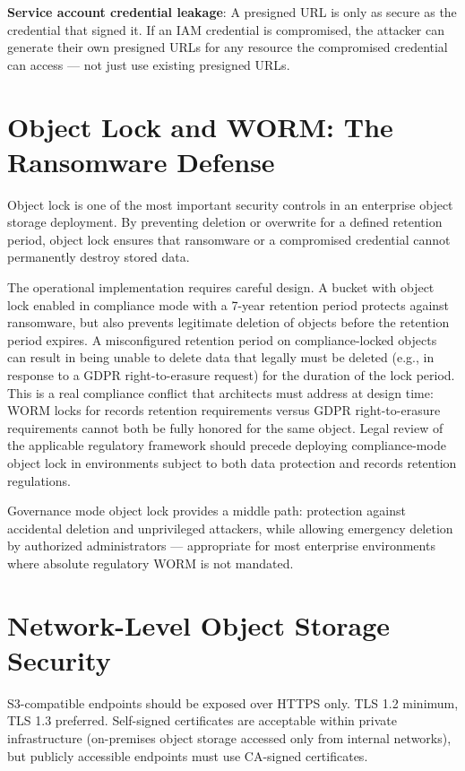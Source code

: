 \textbf{Service account credential leakage}: A presigned URL is only as secure as the credential that signed it. If an IAM credential is compromised, the attacker can generate their own presigned URLs for any resource the compromised credential can access --- not just use existing presigned URLs.

\section{Object Lock and WORM: The Ransomware Defense}
Object lock is one of the most important security controls in an enterprise object storage deployment. By preventing deletion or overwrite for a defined retention period, object lock ensures that ransomware or a compromised credential cannot permanently destroy stored data.

The operational implementation requires careful design. A bucket with object lock enabled in compliance mode with a 7-year retention period protects against ransomware, but also prevents legitimate deletion of objects before the retention period expires. A misconfigured retention period on compliance-locked objects can result in being unable to delete data that legally must be deleted (e.g., in response to a GDPR right-to-erasure request) for the duration of the lock period. This is a real compliance conflict that architects must address at design time: WORM locks for records retention requirements versus GDPR right-to-erasure requirements cannot both be fully honored for the same object. Legal review of the applicable regulatory framework should precede deploying compliance-mode object lock in environments subject to both data protection and records retention regulations.

Governance mode object lock provides a middle path: protection against accidental deletion and unprivileged attackers, while allowing emergency deletion by authorized administrators --- appropriate for most enterprise environments where absolute regulatory WORM is not mandated.

\section{Network-Level Object Storage Security}
S3-compatible endpoints should be exposed over HTTPS only. TLS 1.2 minimum, TLS 1.3 preferred. Self-signed certificates are acceptable within private infrastructure (on-premises object storage accessed only from internal networks), but publicly accessible endpoints must use CA-signed certificates.

